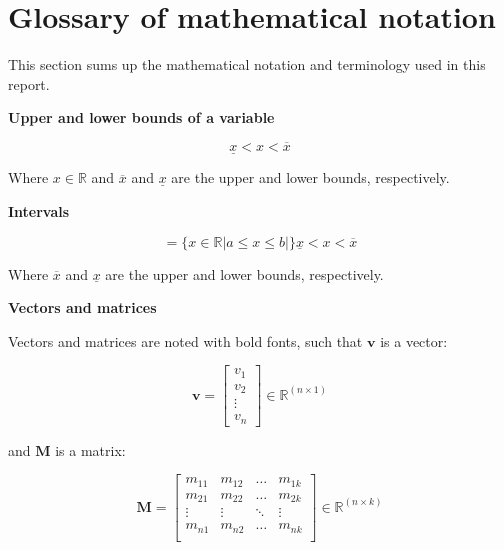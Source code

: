 \section*{Glossary of mathematical notation}

This section sums up the mathematical notation and terminology used in this report.

\textbf{Upper and lower bounds of a variable}

\begin{equation}
\underline{x} < x < \overline{x} 
\end{equation}

 Where $x \in {\mathbb{R}} $ and $\overline{x}$ and $\underline{x}$ are the upper and lower bounds, respectively.
 
 \textbf{Intervals}

\begin{equation}
	[a,b] =  \{x \in \mathbb{R}|a\leq x \leq b|\}
\underline{x} < x < \overline{x} 
\end{equation}

 Where $\overline{x}$ and $\underline{x}$ are the upper and lower bounds, respectively.

 \textbf{Vectors and matrices}

Vectors and matrices are noted with bold fonts, such that $\bm{v}$ is a vector:

\begin{equation}
\bm{v} = 
\begin{bmatrix}

		 v_1 	\\
		 v_2 	\\
		 \vdots \\
		 v_n

\end{bmatrix}
\in \pmb{{\mathbb{R}}}^{(n \times 1)}
\end{equation}

and $\bm{M}$ is a matrix:

\begin{equation}
\bm{M} = 
\begin{bmatrix}

		 m_{11} & m_{12} & \hdots & m_{1k}	\\
		 m_{21} & m_{22} & \hdots & m_{2k}	\\
		 \vdots & \vdots & \ddots & \vdots	\\
		 m_{n1} & m_{n2} & \hdots &m_{nk} \\

\end{bmatrix}
\in \pmb{{\mathbb{R}}}^{(n \times k)}
\end{equation}

